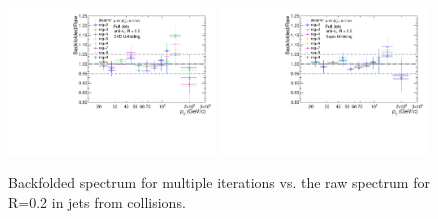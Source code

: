 \begin{figure}[hbt!]
    \centering
    \begin{multicols}{2}
        \includegraphics[width=0.49\textwidth]{figures/pPbFigures/UnfoldingComparisons/BackfoldedVsRaw/RatioFoldRawSvd_R02.pdf}
    \vfill\null
    \columnbreak
        \includegraphics[width=0.49\textwidth]{figures/pPbFigures/UnfoldingComparisons/BackfoldedVsRaw/RatioFoldRawBayes_R02.pdf}
        \vfill\null
    \end{multicols}
    \caption{Backfolded spectrum for multiple iterations vs. the raw spectrum for R=0.2 in jets from \pPb collisions.}
    \label{fig:BackfoldedRawpPb}
\end{figure}



